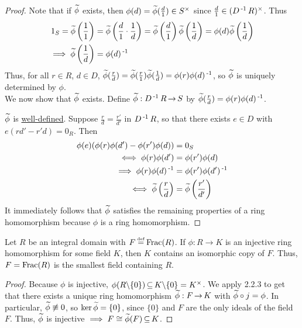 \documentclass[11pt]{book}
\theoremstyle{definition}   \newtheorem{defn}[counter]{Definition} %
\newcommand{\bs}{\backslash}   \newcommand{\A}{\mathcal{A}}   \newcommand{\sy}{\textnormal{Syl}}   \newcommand{\size}[1]{\left| #1 \right|}
\newcommand\myeq{\mathrel{\overset{\makebox[0pt]{\mbox{\normalfont\tiny\sffamily \textrm{def}}}}{=}}}
\DeclareMathOperator{\ra}{\rightarrow}   \DeclareMathOperator{\Poly}{\mathbf{P}}   \DeclareMathOperator{\spn}{\textnormal{span}}   \DeclareMathOperator{\aut}{\textnormal{Aut}}
\newcommand{\vs}{\vspace{8pt}}
\numberwithin{counter}{chapter}
\begin{document}
\begin{proof}
Note that if $\widetilde{\phi}$ exists, then $\phi(d) = \widetilde{\phi}(\frac{d}{1}) \in S^{\times}$ since $\frac{d}{1} \in (D\operatorname{^{-1}} R)^{\times}$. Thus
\begin{align*}
1_S = \widetilde{\phi} \left( \frac{1}{1} \right) &= \widetilde{\phi} \left( \frac{d}{1} \cdot \frac{1}{d} \right) = \widetilde{\phi} \left( \frac{d}{1} \right) \widetilde{\phi} \left(\frac{1}{d} \right) = \phi(d) \widetilde{\phi} \left(\frac{1}{d} \right) \\
\implies \widetilde{\phi} \left(\frac{1}{d} \right) &= \phi(d)\operatorname{^{-1}}
\end{align*}
Thus, for all $r \in R$, $d \in D$, $\widetilde{\phi}(\frac{r}{d}) = \widetilde{\phi}(\frac{r}{1}) \widetilde{\phi}(\frac{1}{d}) = \phi(r) \phi(d)\operatorname{^{-1}}$, so $\widetilde{\phi}$ is uniquely determined by $\phi$. \\

We now show that $\widetilde{\phi}$ exists. Define $\wt{\phi} : D\inv R \ra S$ by $\widetilde{\phi}(\frac{r}{d}) = \phi(r) \phi(d)\operatorname{^{-1}}$.

$\widetilde{\phi}$ is \underline{well-defined}. Suppose $\frac{r}{d} = \frac{r'}{d'}$ in $D\operatorname{^{-1}} R$, so that there exists $e \in D$ with $e(rd'-r'd) = 0_R$. Then
\begin{align*}
\phi(e) (\phi(r)\phi(d') - \phi(r')\phi(d)) &= 0_S \\
\iff \phi(r)\phi(d') &= \phi(r') \phi(d) \\
\implies \phi(r)\phi(d)\operatorname{^{-1}} &= \phi(r')\phi(d')\operatorname{^{-1}} \\
\iff \widetilde{\phi} \left( \frac{r}{d} \right) &= \widetilde{\phi} \left( \frac{r'}{d'} \right)
\end{align*}
It immediately follows that $\widetilde{\phi}$ satisfies the remaining properties of a ring homomorphism because $\phi$ is a ring homomorphism.
\end{proof}

\vs

\begin{corollary}
Let $R$ be an integral domain with $F \myeq \tn{Frac}(R)$. If $\phi : R \ra K$ is an injective ring homomorphism for some field $K$, then $K$ contains an isomorphic copy of $F$. Thus, $F = \textnormal{Frac}(R)$ is the smallest field containing $R$.
\end{corollary}

\begin{proof}
Because $\phi$ is injective, $\phi(R \bs \{0\}) \sub K \bs\{0\} = K\x$. We apply 2.2.3 to get that there exists a unique ring homomorphism $\wt{\phi} : F \ra K$ with $\widetilde{\phi} \circ j = \phi$. In particular, $\widetilde{\phi} \not\equiv 0$, so $\ker \widetilde{\phi} = \{0\}$, since $\{0\}$ and $F$ are the only ideals of the field $F$. Thus, $\widetilde{\phi}$ is injective $\implies F \cong \widetilde{\phi}(F) \operatorname{\subseteq} K$.
\end{proof}
\end{document}
